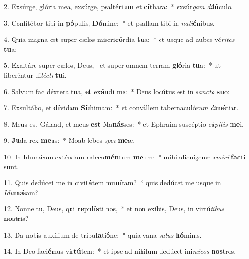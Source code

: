 2. Exsúrge, glória mea, exsúrge, psaltéri\textbf{um} et \textbf{cí}thara:~*  exsúr\textit{gam} \textit{di}\textbf{lú}culo.\

3. Confitébor tibi in \textbf{pó}pulis, \textbf{Dó}mine:~*  et psallam tibi in \textit{na}\textit{ti}\textbf{ó}nibus.\

4. Quia magna est super cælos miseri\textbf{cór}dia \textbf{tu}a:~*  et usque ad nubes vé\textit{ri}\textit{tas} \textbf{tu}a:\

5. Exaltáre super cælos, Deus, \dag\  et super omnem terram \textbf{gló}ria \textbf{tu}a:~*  ut liberéntur di\textit{léc}\textit{ti} \textbf{tu}i.\

6. Salvum fac déxtera tua, \textbf{et} ex\textbf{áu}di me:~*  Deus locútus est in \textit{sanc}\textit{to} \textbf{su}o:\

7. Exsultábo, et \textbf{dí}vidam \textbf{Sí}chimam:~*  et convállem tabernaculó\textit{rum} \textit{di}\textbf{mé}tiar.\

8. Meus est Gálaad, et meus \textbf{est} Ma\textbf{nás}ses:~*  et Ephraim suscéptio cá\textit{pi}\textit{tis} \textbf{me}i.\

9. \textbf{Ju}da rex \textbf{me}us:~*  Moab lebes \textit{spe}\textit{i} \textbf{me}æ.\

10. In Idumǽam exténdam calcea\textbf{mén}tum \textbf{me}um:~*  mihi alienígenæ a\textit{mí}\textit{ci} \textbf{fac}ti sunt.\

11. Quis dedúcet me in civi\textbf{tá}tem mu\textbf{ní}tam?~*  quis dedúcet me usque in \textit{I}\textit{du}\textbf{mǽ}am?\

12. Nonne tu, Deus, qui \textbf{re}pu\textbf{lís}ti nos,~*  et non exíbis, Deus, in virtú\textit{ti}\textit{bus} \textbf{nos}tris?\

13. Da nobis auxílium de tribu\textbf{la}ti\textbf{ó}ne:~*  quia vana \textit{sa}\textit{lus} \textbf{hó}minis.\

14. In Deo faci\textbf{é}mus vir\textbf{tú}tem:~*  et ipse ad níhilum dedúcet ini\textit{mí}\textit{cos} \textbf{nos}tros.\

